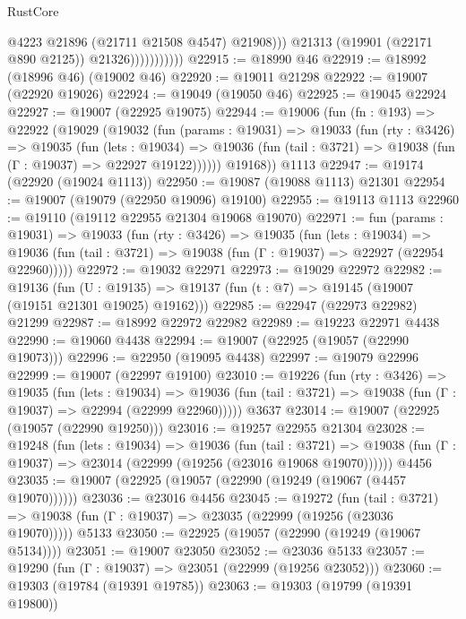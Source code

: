 \begin{lexlean}{RustCore}
\begin{coremodule}
                                @4223
                                @21896
                                (@21711 @21508 @4547)
                                @21908)))
                          @21313
                          (@19901 (@22171 @890 @2125))
                          @21326)))))))))))
@22915 := @18990 @46
@22919 := @18992 (@18996 @46) (@19002 @46)
@22920 := @19011 @21298
@22922 := @19007 (@22920 @19026)
@22924 := @19049 (@19050 @46)
@22925 := @19045 @22924
@22927 := @19007 (@22925 @19075)
@22944 := @19006
    (fun (fn : @193) =>
    @22922
      (@19029
        (@19032
          (fun (params : @19031) =>
          @19033
            (fun (rty : @3426) =>
            @19035
              (fun (lets : @19034) =>
              @19036 (fun (tail : @3721) => @19038 (fun (Γ : @19037) => @22927 @19122))))))
        @19168))
    @1113
@22947 := @19174 (@22920 (@19024 @1113))
@22950 := @19087 (@19088 @1113) @21301
@22954 := @19007 (@19079 (@22950 @19096) @19100)
@22955 := @19113 @1113
@22960 := @19110 (@19112 @22955 @21304 @19068 @19070)
@22971 := fun (params : @19031) =>
  @19033
    (fun (rty : @3426) =>
    @19035
      (fun (lets : @19034) =>
      @19036 (fun (tail : @3721) => @19038 (fun (Γ : @19037) => @22927 (@22954 @22960)))))
@22972 := @19032 @22971
@22973 := @19029 @22972
@22982 := @19136
    (fun (U : @19135) => @19137 (fun (t : @7) => @19145 (@19007 (@19151 @21301 @19025) @19162)))
@22985 := @22947 (@22973 @22982) @21299
@22987 := @18992 @22972 @22982
@22989 := @19223 @22971 @4438
@22990 := @19060 @4438
@22994 := @19007 (@22925 (@19057 (@22990 @19073)))
@22996 := @22950 (@19095 @4438)
@22997 := @19079 @22996
@22999 := @19007 (@22997 @19100)
@23010 := @19226
    (fun (rty : @3426) =>
    @19035
      (fun (lets : @19034) =>
      @19036 (fun (tail : @3721) => @19038 (fun (Γ : @19037) => @22994 (@22999 @22960)))))
    @3637
@23014 := @19007 (@22925 (@19057 (@22990 @19250)))
@23016 := @19257 @22955 @21304
@23028 := @19248
    (fun (lets : @19034) =>
    @19036
      (fun (tail : @3721) =>
      @19038 (fun (Γ : @19037) => @23014 (@22999 (@19256 (@23016 @19068 @19070))))))
    @4456
@23035 := @19007 (@22925 (@19057 (@22990 (@19249 (@19067 (@4457 @19070))))))
@23036 := @23016 @4456
@23045 := @19272
    (fun (tail : @3721) => @19038 (fun (Γ : @19037) => @23035 (@22999 (@19256 (@23036 @19070)))))
    @5133
@23050 := @22925 (@19057 (@22990 (@19249 (@19067 @5134))))
@23051 := @19007 @23050
@23052 := @23036 @5133
@23057 := @19290 (fun (Γ : @19037) => @23051 (@22999 (@19256 @23052)))
@23060 := @19303 (@19784 (@19391 @19785))
@23063 := @19303 (@19799 (@19391 @19800))

\end{coremodule}
\end{lexlean}
